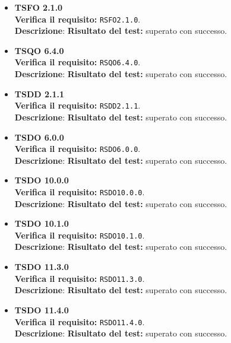 \begin{itemize}
\item \textbf{TSFO 2.1.0}\\
\textbf{Verifica il requisito:} \texttt{RSFO2.1.0}.\\
\textbf{Descrizione}: %
\textbf{Risultato del test:} superato con successo.

\item \textbf{TSQO 6.4.0}\\
\textbf{Verifica il requisito:} \texttt{RSQO6.4.0}.\\
\textbf{Descrizione}: %
\textbf{Risultato del test:} superato con successo.

\item \textbf{TSDD 2.1.1}\\
\textbf{Verifica il requisito:} \texttt{RSDD2.1.1}.\\
\textbf{Descrizione}: %
\textbf{Risultato del test:} superato con successo.

\item \textbf{TSDO 6.0.0}\\
\textbf{Verifica il requisito:} \texttt{RSDO6.0.0}.\\
\textbf{Descrizione}: %
\textbf{Risultato del test:} superato con successo.

\item \textbf{TSDO 10.0.0}\\
\textbf{Verifica il requisito:} \texttt{RSDO10.0.0}.\\
\textbf{Descrizione}: %
\textbf{Risultato del test:} superato con successo.

\item \textbf{TSDO 10.1.0}\\
\textbf{Verifica il requisito:} \texttt{RSDO10.1.0}.\\
\textbf{Descrizione}: %
\textbf{Risultato del test:} superato con successo.

\item \textbf{TSDO 11.3.0}\\
\textbf{Verifica il requisito:} \texttt{RSDO11.3.0}.\\
\textbf{Descrizione}: %
\textbf{Risultato del test:} superato con successo.

\item \textbf{TSDO 11.4.0}\\
\textbf{Verifica il requisito:} \texttt{RSDO11.4.0}.\\
\textbf{Descrizione}: %
\textbf{Risultato del test:} superato con successo.


\end{itemize}
